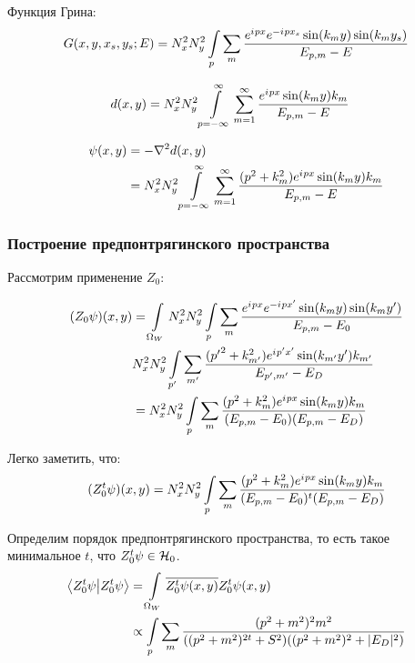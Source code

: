 Функция Грина:
\[
G(x, y, x_s, y_s; E) = N_x^2 N_y^2 \int\limits_p \sum\limits_m \frac{e^{{i\mkern1mu} p x} e^{-{i\mkern1mu} p x_s} \sin(k_m y) \sin(k_m y_s)}{E_{p, m} - E}
\]

\begin{align*}
d(x, y) 
&= N_x^2 N_y^2 \int\limits_{p = -\infty}^\infty \sum\limits_{m = 1}^\infty \frac{e^{{i\mkern1mu} p x} \sin(k_m y) k_m }{E_{p, m} - E}
\end{align*}

\begin{align*}
\psi(x, y) 
&= -\laplacian d(x, y) \\
&= N_x^2 N_y^2 \int\limits_{p = -\infty}^\infty \sum\limits_{m = 1}^\infty \frac{(p^2 + k_m^2) e^{\iu p x} \sin(k_m y) k_m }{E_{p, m} - E}
\end{align*}

\subsubsection{Построение предпонтрягинского пространства}
Рассмотрим применение $Z_0$:

\begin{align*}
(Z_0 \psi)(x, y)
&= \int\limits_{\Omega_W} N_x^2 N_y^2 \int\limits_p \sum\limits_m \frac{e^{{i\mkern1mu} p x} e^{-{i\mkern1mu} p x'} \sin(k_m y) \sin(k_m y')}{E_{p, m} - E_0} \\
&  N_x^2 N_y^2 \int\limits_{p'} \sum\limits_{m'} \frac{({p'}^2 + k_{m'}^2) e^{{i\mkern1mu} p' x'} \sin(k_{m'} y') k_{m'} }{E_{p', m'} - E_D} \\
&= N_x^2 N_y^2 \int\limits_p \sum\limits_m \frac{(p^2 + k_m^2) e^{{i\mkern1mu} p x} \sin(k_m y) k_m}{(E_{p, m} - E_0) (E_{p, m} - E_D)}
\end{align*}

Легко заметить, что:
\begin{align*}
(Z_0^t \psi)(x, y) =
N_x^2 N_y^2 \int\limits_p \sum\limits_m \frac{(p^2 + k_m^2) e^{{i\mkern1mu} p x} \sin(k_m y) k_m}{(E_{p, m} - E_0)^t (E_{p, m} - E_D)}
\end{align*}

Определим порядок предпонтрягинского пространства, то есть такое минимальное $t$, что $Z_0^t \psi \in \mathcal{H}_{0}$.
\begin{align*}
\ip{Z_0^t \psi}{Z_0^t \psi}
&= \int\limits_{\Omega_W} \cconj{Z_0^t \psi(x, y)} Z_0^t \psi(x, y) \\
&\propto \int\limits_p \sum\limits_m \frac{(p^2 + m^2)^2 m^2}{((p^2 + m^2)^{2t} + S^2 ) ((p^2 + m^2)^2 + |E_D|^2)}
\end{align*}


